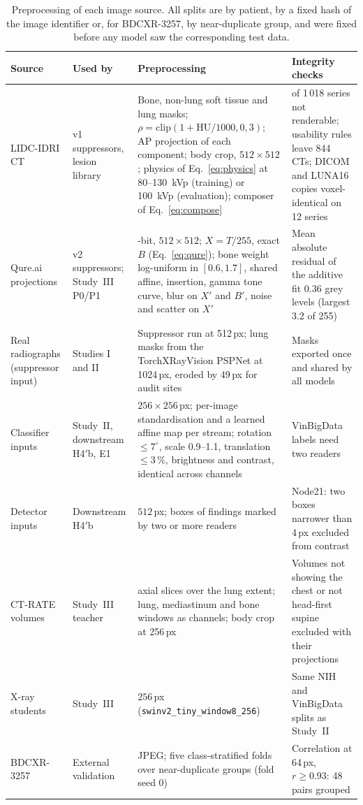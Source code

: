 \begin{table}[!t]
\centering
\caption{Preprocessing of each image source. All splits are by patient, by a fixed hash of the image identifier or, for BDCXR-3257, by
near-duplicate group, and were fixed before any model saw the corresponding test data.}
\label{tab:preproc}
\footnotesize
\renewcommand{\arraystretch}{1.1}
\begin{tabularx}{\textwidth}{@{}>{\raggedright\arraybackslash}p{3.0cm}>{\raggedright\arraybackslash}p{3.0cm}%
>{\raggedright\arraybackslash}X>{\raggedright\arraybackslash}p{3.4cm}@{}}
\toprule
Source & Used by & Preprocessing & Integrity checks \\
\midrule
LIDC-IDRI CT & v1 suppressors, lesion library & Bone, non-lung soft tissue and lung masks; $\rho=\mathrm{clip}(1+\mathrm{HU}/1000,0,3)$; AP
 projection of each component; body crop, $512\times512$; physics of Eq.~\eqref{eq:physics} at 80--130~kVp (training) or 100~kVp
 (evaluation); composer of Eq.~\eqref{eq:compose} & 18 of 1\,018 series not renderable; usability rules leave 844 CTs; DICOM and LUNA16
 copies voxel-identical on 12 series\\
Qure.ai projections & v2 suppressors; Study~III P0/P1 & 8-bit, $512\times512$; $X=T/255$, exact $B$ (Eq.~\eqref{eq:qure}); bone weight
 log-uniform in $[0.6,1.7]$, shared affine, insertion, gamma tone curve, blur on $X'$ and $B'$, noise and scatter on $X'$ & Mean absolute
 residual of the additive fit 0.36 grey levels (largest 3.2 of 255)\\
Real radiographs (suppressor input) & Studies I and II & Suppressor run at 512\,px; lung masks from the TorchXRayVision PSPNet at
 1024\,px, eroded by 49\,px for audit sites & Masks exported once and shared by all models\\
Classifier inputs & Study~II, downstream H4$'$b, E1 & $256\times256$\,px; per-image standardisation and a learned affine map per
 stream; rotation $\le7^\circ$, scale 0.9--1.1, translation $\le3$\,\%, brightness and contrast, identical across channels & VinBigData
 labels need two readers\\
Detector inputs & Downstream H4$'$b & $512$\,px; boxes of findings marked by two or more readers & Node21: two boxes narrower than 4\,px
 excluded from contrast\\
CT-RATE volumes & Study~III teacher & 24 axial slices over the lung extent; lung, mediastinum and bone windows as channels; body crop at
 256\,px & Volumes not showing the chest or not head-first supine excluded with their projections\\
X-ray students & Study~III & $256$\,px (\texttt{swinv2\_tiny\_window8\_256}) & Same NIH and VinBigData splits as Study~II\\
BDCXR-3257 & External validation & JPEG; five class-stratified folds over near-duplicate groups (fold seed 0) & Correlation at 64\,px,
 $r\ge0.93$: 48 pairs grouped\\
\bottomrule
\end{tabularx}
\end{table}


